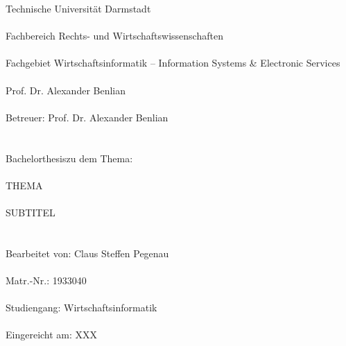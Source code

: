 %
%
%
%

\singlespacing 
\noindent Technische Universität Darmstadt \\\\
Fachbereich Rechts- und Wirtschaftswissenschaften \\\\
Fachgebiet Wirtschaftsinformatik -- Information Systems \& Electronic Services \\\\
Prof. Dr. Alexander Benlian \\\\
Betreuer: Prof. Dr. Alexander Benlian \\\\
\\
\lbrack Bachelorthesis\rbrack zu dem Thema: \\\\
\lbrack THEMA\rbrack \\\\
\lbrack SUBTITEL\rbrack \\\\
\\
Bearbeitet von: Claus Steffen Pegenau \\\\
Matr.-Nr.: 1933040 \\\\
Studiengang: Wirtschaftsinformatik \\\\
Eingereicht am: \lbrack XXX\rbrack \\\\

\onehalfspacing

\setcounter{page}{2}